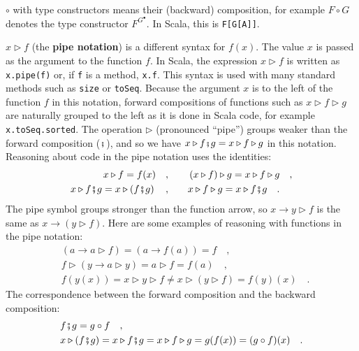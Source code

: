 $\circ$ with type constructors means their (backward) composition,
for example $F\circ G$ denotes the type constructor $F^{G^{\bullet}}$.
In Scala, this is \lstinline!F[G[A]]!. 

$x\triangleright f$ (the \textbf{pipe notation})
is a different syntax for $f(x)$. The value $x$ is passed as the
argument to the function $f$. In Scala, the expression $x\triangleright f$
is written as \lstinline!x.pipe(f)! or, if \lstinline!f! is a method,
\lstinline!x.f!. This syntax is used with many standard methods such
as \lstinline!size! or \lstinline!toSeq!. Because the argument $x$
is to the left of the function $f$ in this notation, forward compositions
of functions such as $x\triangleright f\triangleright g$ are naturally
grouped to the left as it is done in Scala code, for example \lstinline!x.toSeq.sorted!.
The operation $\triangleright$ (pronounced \textsf{``}pipe\textsf{''}) groups weaker
than the forward composition ($\bef$), and so we have $x\triangleright f\bef g=x\triangleright f\triangleright g$
in this notation. Reasoning about code in the pipe notation uses the
identities:
\begin{align*}
x\triangleright f=f(x)\quad,\quad\quad & \left(x\triangleright f\right)\triangleright g=x\triangleright f\triangleright g\quad,\\
x\triangleright f\bef g=x\triangleright\left(f\bef g\right)\quad,\quad\quad & x\triangleright f\triangleright g=x\triangleright f\bef g\quad.
\end{align*}
The pipe symbol groups stronger than the function arrow, so $x\rightarrow y\triangleright f$
is the same as $x\rightarrow(y\triangleright f)$. Here are some examples
of reasoning with functions in the pipe notation:
\begin{align*}
 & \left(a\rightarrow a\triangleright f\right)=\left(a\rightarrow f(a)\right)=f\quad,\\
 & f\triangleright\left(y\rightarrow a\triangleright y\right)=a\triangleright f=f(a)\quad,\\
 & f(y(x))=x\triangleright y\triangleright f\neq x\triangleright\left(y\triangleright f\right)=f(y)(x)\quad.
\end{align*}
The correspondence between the forward composition and the backward
composition:
\begin{align*}
 & f\bef g=g\circ f\quad,\\
 & x\triangleright(f\bef g)=x\triangleright f\bef g=x\triangleright f\triangleright g=g(f(x))=(g\circ f)(x)\quad.
\end{align*}

